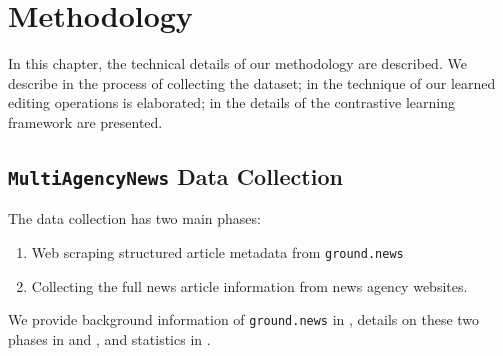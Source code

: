 \chapter{Methodology}
In this chapter, the technical details of our methodology are described. We describe in  the process of collecting the dataset; in  the technique of our learned editing operations is elaborated; in  the details of the contrastive learning framework are presented.

\section{\texttt{MultiAgencyNews} Data Collection}
\label{data-collection}
The data collection has two main phases:
\begin{enumerate}
    \item Web scraping structured article metadata from \texttt{ground.news}
    \item Collecting the full news article information from news agency websites.
\end{enumerate}
We provide background information of \texttt{ground.news} in , details on these two phases in  and , and statistics in .

